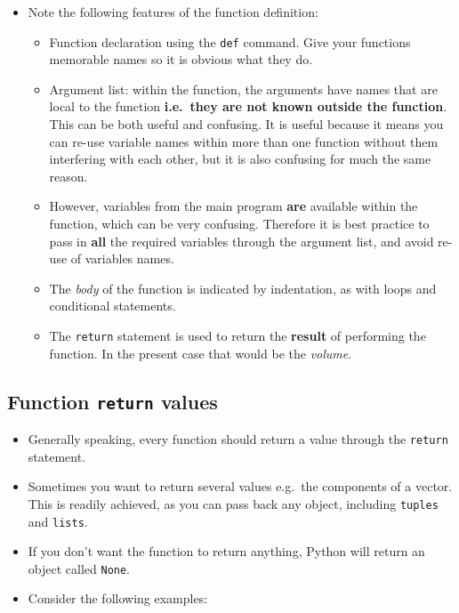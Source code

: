 \documentclass[10pt]{article}
\providecommand{\tightlist}{%
      \setlength{\itemsep}{0pt}\setlength{\parskip}{0pt}}
\begin{document}
    \begin{itemize}
\tightlist
\item
  Note the following features of the function definition:

  \begin{itemize}
  \tightlist
  \item
    Function declaration using the \texttt{def} command. Give your
    functions memorable names so it is obvious what they do.
  \item
    Argument list: within the function, the arguments have names that
    are local to the function \textbf{i.e.~they are not known outside
    the function}. This can be both useful and confusing. It is useful
    because it means you can re-use variable names within more than one
    function without them interfering with each other, but it is also
    confusing for much the same reason.
  \item
    However, variables from the main program \textbf{are} available
    within the function, which can be very confusing. Therefore it is
    best practice to pass in \textbf{all} the required variables through
    the argument list, and avoid re-use of variables names.
  \item
    The \emph{body} of the function is indicated by indentation, as with
    loops and conditional statements.
  \item
    The \texttt{return} statement is used to return the \textbf{result}
    of performing the function. In the present case that would be the
    \emph{volume}.
  \end{itemize}
\end{itemize}

    \hypertarget{function-return-values}{%
\subsection{\texorpdfstring{Function \texttt{return}
values}{Function return values}}\label{function-return-values}}

\begin{itemize}
\tightlist
\item
  Generally speaking, every function should return a value through the
  \texttt{return} statement.
\item
  Sometimes you want to return several values e.g.~the components of a
  vector. This is readily achieved, as you can pass back any object,
  including \texttt{tuples} and \texttt{lists}.
\item
  If you don't want the function to return anything, Python will return
  an object called \texttt{None}.
\item
  Consider the following examples:
\end{itemize}
\end{document}
